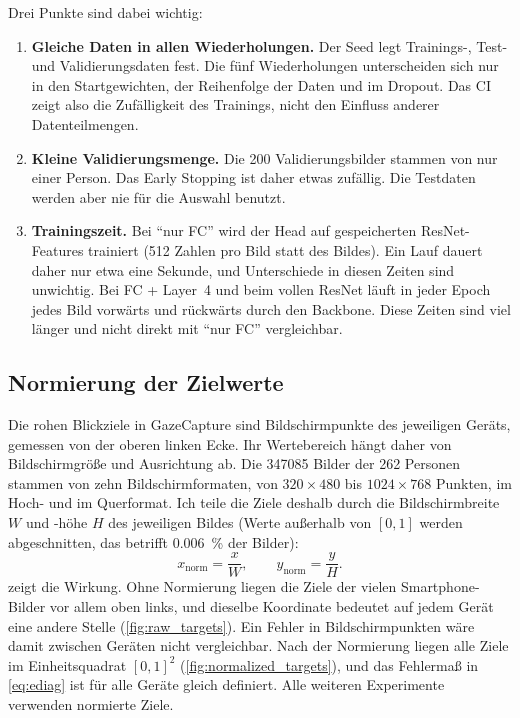 Drei Punkte sind dabei wichtig:
\begin{enumerate}[nosep]
  \item \textbf{Gleiche Daten in allen Wiederholungen.} Der Seed legt
        Trainings-, Test- und Validierungsdaten fest. Die fünf Wiederholungen
        unterscheiden sich nur in den Startgewichten, der Reihenfolge der Daten
        und im Dropout. Das CI zeigt also die Zufälligkeit des Trainings, nicht
        den Einfluss anderer Datenteilmengen.
  \item \textbf{Kleine Validierungsmenge.} Die 200 Validierungsbilder stammen
        von nur einer Person. Das Early Stopping ist daher etwas zufällig. Die
        Testdaten werden aber nie für die Auswahl benutzt.
  \item \textbf{Trainingszeit.} Bei \enquote{nur FC} wird der Head auf
        gespeicherten ResNet-Features trainiert (512 Zahlen pro Bild statt
        des Bildes). Ein Lauf dauert daher nur etwa eine Sekunde, und
        Unterschiede in diesen Zeiten sind unwichtig. Bei FC + Layer~4 und beim
        vollen ResNet läuft in jeder Epoch jedes Bild vorwärts und rückwärts
        durch den Backbone. Diese Zeiten sind viel länger und nicht direkt mit
        \enquote{nur FC} vergleichbar.
\end{enumerate}

\subsection{Normierung der Zielwerte}
\label{sec:normalization}

Die rohen Blickziele in GazeCapture sind Bildschirmpunkte des jeweiligen
Geräts, gemessen von der oberen linken Ecke. Ihr Wertebereich hängt daher von
Bildschirmgröße und Ausrichtung ab. Die \num{347085} Bilder der 262 Personen
stammen von zehn Bildschirmformaten, von $320\times480$ bis $1024\times768$
Punkten, im Hoch- und im Querformat. Ich teile die Ziele deshalb durch die
Bildschirmbreite $W$ und -höhe $H$ des jeweiligen Bildes (Werte
außerhalb von $[0,1]$ werden abgeschnitten, das betrifft \SI{0,006}{\percent}
der Bilder):
\begin{equation}
  x_{\mathrm{norm}} = \frac{x}{W},\qquad y_{\mathrm{norm}} = \frac{y}{H}.
\end{equation}
 zeigt die Wirkung. Ohne Normierung liegen die Ziele
der vielen Smartphone-Bilder vor allem oben links, und dieselbe Koordinate
bedeutet auf jedem Gerät eine andere Stelle (\cref{fig:raw_targets}). Ein Fehler
in Bildschirmpunkten wäre damit zwischen Geräten nicht vergleichbar. Nach der
Normierung liegen alle Ziele im Einheitsquadrat $[0,1]^2$
(\cref{fig:normalized_targets}), und das Fehlermaß in \cref{eq:ediag} ist für
alle Geräte gleich definiert. Alle weiteren Experimente verwenden normierte
Ziele.

